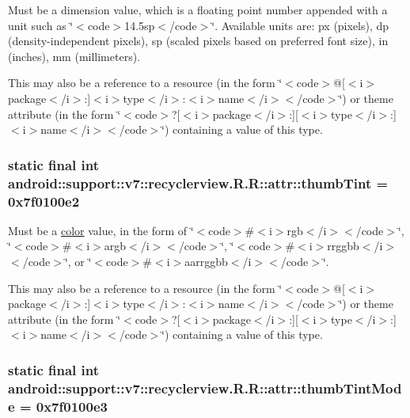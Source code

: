 Must be a dimension value, which is a floating point number appended with a unit such as \char`\"{}$<$code$>$14.5sp$<$/code$>$\char`\"{}. Available units are: px (pixels), dp (density-independent pixels), sp (scaled pixels based on preferred font size), in (inches), mm (millimeters). 

This may also be a reference to a resource (in the form \char`\"{}$<$code$>$@\mbox{[}$<$i$>$package$<$/i$>$:\mbox{]}$<$i$>$type$<$/i$>$:$<$i$>$name$<$/i$>$$<$/code$>$\char`\"{}) or theme attribute (in the form \char`\"{}$<$code$>$?\mbox{[}$<$i$>$package$<$/i$>$:\mbox{]}\mbox{[}$<$i$>$type$<$/i$>$:\mbox{]}$<$i$>$name$<$/i$>$$<$/code$>$\char`\"{}) containing a value of this type. \hypertarget{classandroid_1_1support_1_1v7_1_1recyclerview_1_1_r_1_1attr_0206336715d9900d46999c4b734078c5}{
\subsubsection[{thumbTint}]{\setlength{\rightskip}{0pt plus 5cm}static final int android::support::v7::recyclerview.R.R::attr::thumbTint = 0x7f0100e2}}
\label{classandroid_1_1support_1_1v7_1_1recyclerview_1_1_r_1_1attr_0206336715d9900d46999c4b734078c5}


Must be a \hyperlink{classandroid_1_1support_1_1v7_1_1recyclerview_1_1_r_1_1color}{color} value, in the form of \char`\"{}$<$code$>$\#$<$i$>$rgb$<$/i$>$$<$/code$>$\char`\"{}, \char`\"{}$<$code$>$\#$<$i$>$argb$<$/i$>$$<$/code$>$\char`\"{}, \char`\"{}$<$code$>$\#$<$i$>$rrggbb$<$/i$>$$<$/code$>$\char`\"{}, or \char`\"{}$<$code$>$\#$<$i$>$aarrggbb$<$/i$>$$<$/code$>$\char`\"{}. 

This may also be a reference to a resource (in the form \char`\"{}$<$code$>$@\mbox{[}$<$i$>$package$<$/i$>$:\mbox{]}$<$i$>$type$<$/i$>$:$<$i$>$name$<$/i$>$$<$/code$>$\char`\"{}) or theme attribute (in the form \char`\"{}$<$code$>$?\mbox{[}$<$i$>$package$<$/i$>$:\mbox{]}\mbox{[}$<$i$>$type$<$/i$>$:\mbox{]}$<$i$>$name$<$/i$>$$<$/code$>$\char`\"{}) containing a value of this type. \hypertarget{classandroid_1_1support_1_1v7_1_1recyclerview_1_1_r_1_1attr_df7642adc48701043abe9baab13c6314}{
\subsubsection[{thumbTintMode}]{\setlength{\rightskip}{0pt plus 5cm}static final int android::support::v7::recyclerview.R.R::attr::thumbTintMode = 0x7f0100e3}}
\label{classandroid_1_1support_1_1v7_1_1recyclerview_1_1_r_1_1attr_df7642adc48701043abe9baab13c6314}


